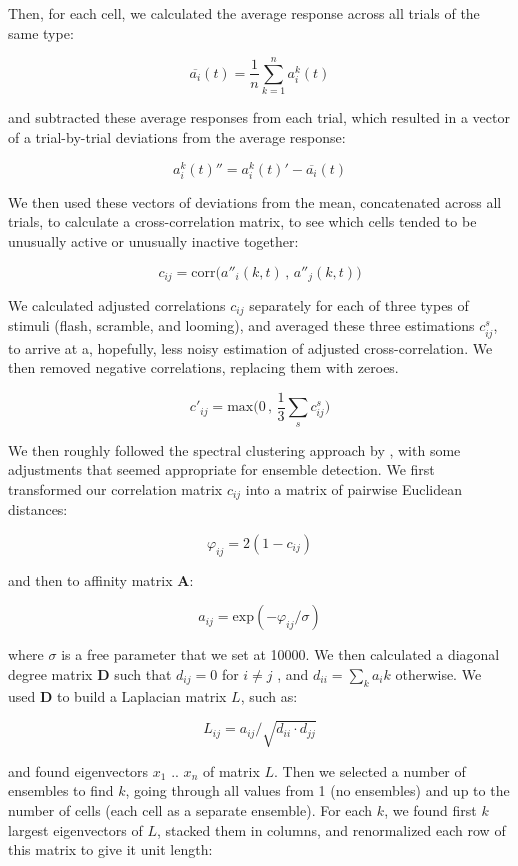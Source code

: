 \documentclass{article}
\begin{document}
Then, for each cell, we calculated the average response across all trials of the same type: 

\[ \overline{a_i}(t) = \frac{1}{n}\sum_{k=1}^n{a^k_i(t)} \]

and subtracted these average responses from each trial, which resulted in a vector of a trial-by-trial deviations from the average response:

\[ a^k_i(t)'' = a^k_i(t)' - \overline{a_i}(t) \]

We then used these vectors of deviations from the mean, concatenated across all trials, to calculate a cross-correlation matrix, to see which cells tended to be unusually active or unusually inactive together:

\[ c_{ij} = \text{corr}\big(a''_i(k,t)\, , \, a''_j(k,t)\big) \]

We calculated adjusted correlations $c_{ij}$ separately for each of three types of stimuli (flash, scramble, and looming), and averaged these three estimations $c_{ij}^s$, to arrive at a, hopefully, less noisy estimation of adjusted cross-correlation. We then removed negative correlations, replacing them with zeroes.

\[ c'_{ij} = \text{max}\big(0 \, , \, \frac{1}{3} \sum_{s}{c_{ij}^s}\big) \]

We then roughly followed the spectral clustering approach by \citep{ng2002spectral}, with some adjustments that seemed appropriate for ensemble detection. We first transformed our correlation matrix $c_{ij}$ into a matrix of pairwise Euclidean distances:

\[ \varphi_{ij} = 2(1-c_{ij}) \]

and then to affinity matrix $\textbf{A}$:

\[ a_{ij} = \text{exp}(-\varphi_{ij}/\sigma) \]

where $\sigma$ is a free parameter that we set at 10000. We then calculated a diagonal degree matrix $\textbf{D}$ such that $d_{ij} = 0$ for $i \neq j$ , and $d_{ii} = \sum_k{a_ik}$ otherwise. We used $\textbf{D}$ to build a Laplacian matrix $L$, such as:

\[ L_{ij} = a_{ij}/\sqrt{d_{ii}\cdot d_{jj}} \]

and found eigenvectors $x_1$ .. $x_n$ of matrix $L$. Then we selected a number of ensembles to find $k$, going through all values from 1 (no ensembles) and up to the number of cells (each cell as a separate ensemble). For each $k$, we found first $k$ largest eigenvectors of $L$, stacked them in columns, and renormalized each row of this matrix to give it unit length:
\end{document}
